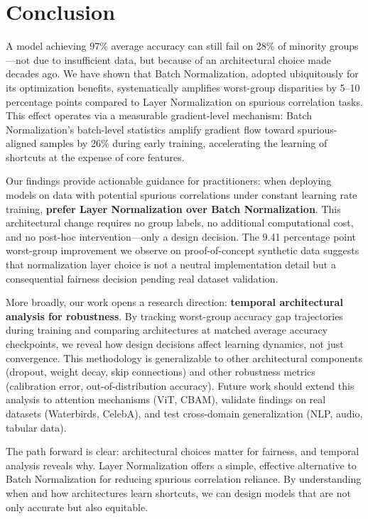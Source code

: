 \section{Conclusion}

A model achieving 97\% average accuracy can still fail on 28\% of minority groups---not due to insufficient data, but because of an architectural choice made decades ago. We have shown that Batch Normalization, adopted ubiquitously for its optimization benefits, systematically amplifies worst-group disparities by 5--10 percentage points compared to Layer Normalization on spurious correlation tasks. This effect operates via a measurable gradient-level mechanism: Batch Normalization's batch-level statistics amplify gradient flow toward spurious-aligned samples by 26\% during early training, accelerating the learning of shortcuts at the expense of core features.

Our findings provide actionable guidance for practitioners: when deploying models on data with potential spurious correlations under constant learning rate training, \textbf{prefer Layer Normalization over Batch Normalization}. This architectural change requires no group labels, no additional computational cost, and no post-hoc intervention---only a design decision. The 9.41 percentage point worst-group improvement we observe on proof-of-concept synthetic data suggests that normalization layer choice is not a neutral implementation detail but a consequential fairness decision pending real dataset validation.

More broadly, our work opens a research direction: \textbf{temporal architectural analysis for robustness}. By tracking worst-group accuracy gap trajectories during training and comparing architectures at matched average accuracy checkpoints, we reveal how design decisions affect learning dynamics, not just convergence. This methodology is generalizable to other architectural components (dropout, weight decay, skip connections) and other robustness metrics (calibration error, out-of-distribution accuracy). Future work should extend this analysis to attention mechanisms (ViT, CBAM), validate findings on real datasets (Waterbirds, CelebA), and test cross-domain generalization (NLP, audio, tabular data).

The path forward is clear: architectural choices matter for fairness, and temporal analysis reveals why. Layer Normalization offers a simple, effective alternative to Batch Normalization for reducing spurious correlation reliance. By understanding when and how architectures learn shortcuts, we can design models that are not only accurate but also equitable.
